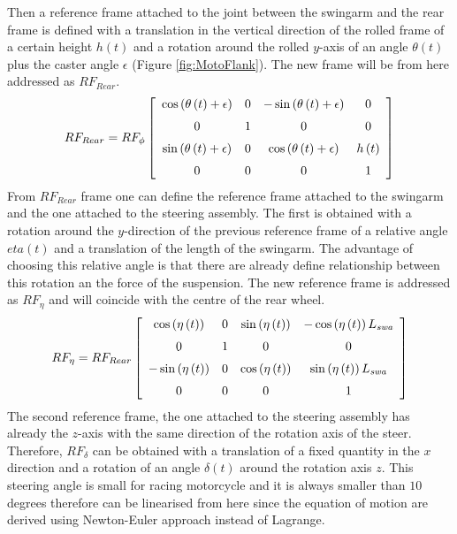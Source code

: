 %
%
Then a reference frame attached to the joint between the swingarm and the rear frame is defined with a translation in the vertical direction of the rolled frame of a certain height $h(t)$ and a rotation around the rolled $y$-axis of an angle $\theta(t)$ plus the caster angle $\epsilon$ (Figure \ref{fig:MotoFlank}). The new frame will be from here addressed as $RF_{Rear}$.
%
\begin{equation}
    RF_{Rear} = RF_\phi 
    \left[ \begin {array}{cccc} \cos \left( \theta \left( t \right) +
    \epsilon \right) &0&-\sin \left( \theta \left( t \right) +\epsilon
    \right) &0\\ \noalign{\medskip}0&1&0&0\\ \noalign{\medskip}\sin
    \left( \theta \left( t \right) +\epsilon \right) &0&\cos \left( 
    \theta \left( t \right) +\epsilon \right) &h \left( t \right) 
    \\ \noalign{\medskip}0&0&0&1\end {array} \right] 
\end{equation}
%
From $RF_{Rear}$ frame one can define the reference frame attached to the swingarm and the one attached to the steering assembly. The first is obtained with a rotation around the $y$-direction of the previous reference frame of a relative angle $eta(t)$ and a translation of the length of the swingarm. The advantage of choosing this relative angle is that there are already define relationship between this rotation an the force of the suspension. The new reference frame is addressed as $RF_\eta$ and will coincide with the centre of the rear wheel.
%
\begin{equation}
    RF_{\eta} = RF_{Rear} 
    \left[ \begin {array}{cccc} \cos \left( \eta \left( t \right) 
    \right) &0&\sin \left( \eta \left( t \right)  \right) &-\cos \left( 
    \eta \left( t \right)  \right) L_{{\it swa}}\\ \noalign{\medskip}0&1&0
    &0\\ \noalign{\medskip}-\sin \left( \eta \left( t \right)  \right) &0&
    \cos \left( \eta \left( t \right)  \right) &\sin \left( \eta \left( t
    \right)  \right) L_{{\it swa}}\\ \noalign{\medskip}0&0&0&1
    \end {array} \right]
\end{equation}
%
The second reference frame, the one attached to the steering assembly has already the $z$-axis with the same direction of the rotation axis of the steer. Therefore, $RF_\delta$ can be obtained with a translation of a fixed quantity in the $x$ direction and a rotation of an angle $\delta(t)$ around the rotation axis $z$. This steering angle is small for racing motorcycle and it is always smaller than $10$ degrees therefore can be linearised from here since the equation of motion are derived using Newton-Euler approach instead of Lagrange.
